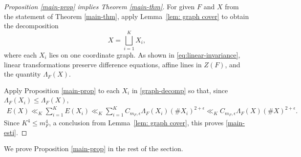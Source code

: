\documentclass{amsart}%
\numberwithin{equation}{section}
\newcommand{\e}{\epsilon}
\newcommand{\1}{\mathbbm{1}}
\begin{document}
\begin{proof}[Proposition \ref{main-prop} implies Theorem \ref{main-thm}]

For given $F$ and $X$ from the statement of Theorem \ref{main-thm}, apply Lemma~\ref{lem: graph cover} to obtain the decomposition
\begin{equation}
\label{graph-decomp}
    X=\bigsqcup_{i=1}^K X_i, 
\end{equation}
where each $X_i$ lies on one coordinate graph. 
As shown in \eqref{eq:linear-invariance}, linear transformations preserve difference equations, affine lines in $ Z(F)$, and the quantity $\Lambda_{F}(X)$.

Apply Proposition \ref{main-prop} to each $X_i$ in \eqref{graph-decomp} so that, since $\Lambda_{F}(X_i)\leq\Lambda_{F}(X)$,
\begin{align*}
    E(X)
    \ll_K\sum_{i=1}^K E(X_i)\ll_K\sum_{i=1}^K C_{m_F,\e}\Lambda_{F}(X_i)(\#X_i)^{2+\e}\ll_K C_{m_F,\e}\Lambda_{F}(X)(\#X)^{2+\e}.
\end{align*}
Since $K^4\leq m_F^4$, a conclusion from Lemma~\ref{lem: graph cover}, this proves \eqref{main-esti}. 
\qedhere


\end{proof}


\medskip

We prove Proposition \ref{main-prop} in the rest of the section.
\end{document}
